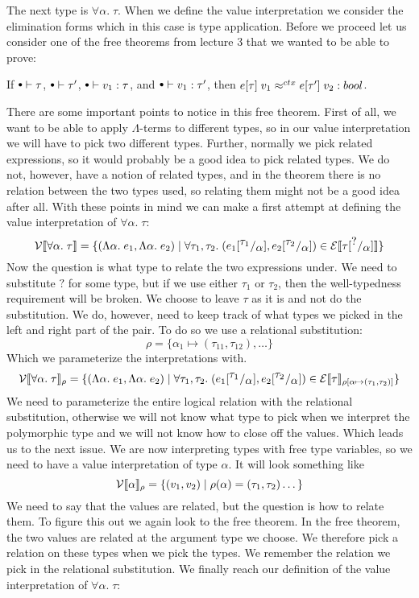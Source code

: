 The next type is $\forall \alpha. \; \tau$. When we define the value interpretation we consider the elimination forms which in this case is type application. Before we proceed let us consider one of the free theorems from lecture 3 that we wanted to be able to prove:
\begin{theorem}
  If $\mtenv \vdash \tau$, 
  $\mtenv \vdash \tau'$, 
  $\mtenv \vdash v_1 : \tau$, 
  and $\mtenv \vdash v_1 : \tau'$, 
  then $\ctxeq{e[\tau]\; v_1}{e[\tau']\; v_2} : bool$.
\end{theorem}
There are some important points to notice in this free theorem. First of all, we want to be able to apply $\Lambda$-terms to different types, so in our value interpretation we will have to pick two different types. Further, normally we pick related expressions, so it would probably be a good idea to pick related types. We do not, however, have a notion of related types, and in the theorem there is no relation between the two types used, so relating them might not be a good idea after all. With these points in mind we can make a first attempt at defining the value interpretation of $\forall \alpha. \; \tau$:
\[
  \vpred{\forall \alpha. \; \tau} = \{(\tLabs{e_1}, \tLabs{e_2}) \vbar \forall \tau_1,\tau_2. \; (\subst{e_1}{\tau_1}{\alpha},\subst{e_2}{\tau_2}{\alpha}) \in \epred{\subst{\tau}{?}{\alpha}} \}
  \]
Now the question is what type to relate the two expressions under. We need to substitute $?$ for some type, but if we use either $\tau_1$ or $\tau_2$, then the well-typedness requirement will be broken. We choose to leave $\tau$ as it is and not do the substitution. We do, however, need to keep track of what types we picked in the left and right part of the pair. To do so we use a relational substitution:
\[
  \rho = \{ \alpha_1 \mapsto (\tau_{11},\tau_{12} ), \dots \}
\]
Which we parameterize the interpretations with.
\[
  \vprep{\forall \alpha.\; \tau} = \{(\tLabs{e_1},\tLabs{e_2}) \vbar \forall \tau_1 , \tau_2. \; (\subst{e_1}{\tau_1}{\alpha},\subst{e_2}{\tau_2}{\alpha}) \in \eprep[\extsub{\rho}{\alpha}{(\tau_1,\tau_2)}]{\tau} \}
\]
We need to parameterize the entire logical relation with the relational substitution, otherwise we will not know what type to pick when we interpret the polymorphic type and we will not know how to close off the values. Which leads us to the next issue. We are now interpreting types with free type variables, so we need to have a value interpretation of type $\alpha$. It will look something like
\[
\vprep{\alpha} = \{(v_1,v_2) \vbar \rho(\alpha) = (\tau_1,\tau_2) \dots\}
\]
We need to say that the values are related, but the question is how to relate them. To figure this out we again look to the free theorem. In the free theorem, the two values are related at the argument type we choose. We therefore pick a relation on these types when we pick the types. We remember the relation we pick in the relational substitution. We finally reach our definition of the value interpretation of $\forall \alpha. \; \tau$:
